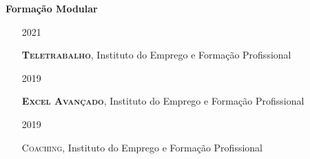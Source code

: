 \documentclass[10pt,a4paper,oneside]{article}
\newlength{\datewidth}
\newlength{\textindent}
\begin{document}
	\vspace{5mm}
	
	\textbf{\hspace{\textindent}Formação Modular}
	\begin{itemize}
		\item[\hspace{\datewidth}\scriptsize 2021] \parbox[t]{\dimexpr\linewidth-\datewidth-\textindent}{\textsc{\textbf{Teletrabalho}}, Instituto do Emprego e Formação Profissional}
		\item[\hspace{\datewidth}\scriptsize 2019] \parbox[t]{\dimexpr\linewidth-\datewidth-\textindent}{\textsc{\textbf{Excel Avançado}}, Instituto do Emprego e Formação Profissional}
		\item[\hspace{\datewidth}\scriptsize 2019] \parbox[t]{\dimexpr\linewidth-\datewidth-\textindent}{\textsc{Coaching}, Instituto do Emprego e Formação Profissional}
		
	\end{itemize}
	
	
	
	\vspace{5mm}
	
\end{document}
